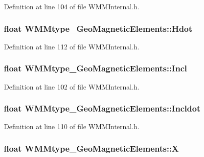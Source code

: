 Definition at line 104 of file W\-M\-M\-Internal.\-h.

\hypertarget{struct_w_m_mtype___geo_magnetic_elements_aa1e42deb6458e019df1619c0fec2ba3c}{
\subsubsection[{Hdot}]{\setlength{\rightskip}{0pt plus 5cm}float W\-M\-Mtype\-\_\-\-Geo\-Magnetic\-Elements\-::\-Hdot}}\label{struct_w_m_mtype___geo_magnetic_elements_aa1e42deb6458e019df1619c0fec2ba3c}


Definition at line 112 of file W\-M\-M\-Internal.\-h.

\hypertarget{struct_w_m_mtype___geo_magnetic_elements_a7457bb44f79e87703e2c83bab3c71ae9}{
\subsubsection[{Incl}]{\setlength{\rightskip}{0pt plus 5cm}float W\-M\-Mtype\-\_\-\-Geo\-Magnetic\-Elements\-::\-Incl}}\label{struct_w_m_mtype___geo_magnetic_elements_a7457bb44f79e87703e2c83bab3c71ae9}


Definition at line 102 of file W\-M\-M\-Internal.\-h.

\hypertarget{struct_w_m_mtype___geo_magnetic_elements_aac0feb3987db9841acd278f27f0726c7}{
\subsubsection[{Incldot}]{\setlength{\rightskip}{0pt plus 5cm}float W\-M\-Mtype\-\_\-\-Geo\-Magnetic\-Elements\-::\-Incldot}}\label{struct_w_m_mtype___geo_magnetic_elements_aac0feb3987db9841acd278f27f0726c7}


Definition at line 110 of file W\-M\-M\-Internal.\-h.

\hypertarget{struct_w_m_mtype___geo_magnetic_elements_af81004bb2f8cd436246b1b4240d1acc9}{
\subsubsection[{X}]{\setlength{\rightskip}{0pt plus 5cm}float W\-M\-Mtype\-\_\-\-Geo\-Magnetic\-Elements\-::\-X}}\label{struct_w_m_mtype___geo_magnetic_elements_af81004bb2f8cd436246b1b4240d1acc9}


